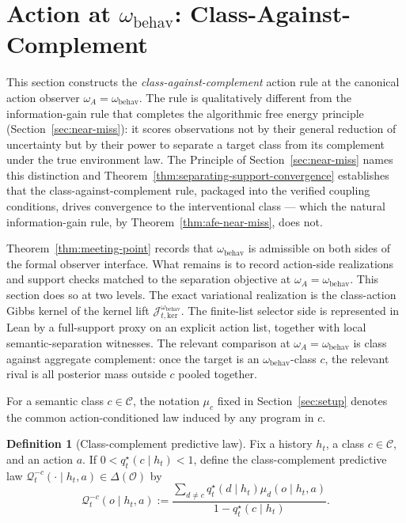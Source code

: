 \documentclass[11pt]{article}
\theoremstyle{definition}
\newtheorem{definition}[theorem]{Definition}
\theoremstyle{remark}
\theoremstyle{plain}
\theoremstyle{definition}
\newcommand{\Ccal}{\mathcal{C}}
\newcommand{\Ocal}{\mathcal{O}}
\newcommand{\Qcal}{\mathcal{Q}}
\begin{document}
\section{Action at $\omega_{\mathrm{behav}}$: Class-Against-Complement}
\label{sec:semantic-action}

This section constructs the \emph{class-against-complement} action rule at the canonical action observer $\omega_A=\omega_{\mathrm{behav}}$. The rule is qualitatively different from the information-gain rule that completes the algorithmic free energy principle (Section~\ref{sec:near-miss}): it scores observations not by their general reduction of uncertainty but by their power to separate a target class from its complement under the true environment law. The Principle of Section~\ref{sec:near-miss} names this distinction and Theorem~\ref{thm:separating-support-convergence} establishes that the class-against-complement rule, packaged into the verified coupling conditions, drives convergence to the interventional class --- which the natural information-gain rule, by Theorem~\ref{thm:afe-near-miss}, does not.

Theorem~\ref{thm:meeting-point} records that $\omega_{\mathrm{behav}}$ is admissible on both sides of the formal observer interface. What remains is to record action-side realizations and support checks matched to the separation objective at $\omega_A=\omega_{\mathrm{behav}}$. This section does so at two levels. The exact variational realization is the class-action Gibbs kernel of the kernel lift $\mathcal J_{t,\mathrm{ker}}^{\omega_{\mathrm{behav}}}$. The finite-list selector side is represented in Lean by a full-support proxy on an explicit action list, together with local semantic-separation witnesses. The relevant comparison at $\omega_A=\omega_{\mathrm{behav}}$ is class against aggregate complement: once the target is an $\omega_{\mathrm{behav}}$-class $c$, the relevant rival is all posterior mass outside $c$ pooled together.

For a semantic class $c\in\Ccal$, the notation $\mu_c$ fixed in Section~\ref{sec:setup} denotes the common action-conditioned law induced by any program in $c$.

\begin{definition}[Class-complement predictive law]
\label{def:class-complement}
Fix a history $h_t$, a class $c\in\Ccal$, and an action $a$. If $0<q_t^\star(c\mid h_t)<1$, define the class-complement predictive law $\Qcal_t^{-c}(\cdot\mid h_t,a)\in\Delta(\Ocal)$ by
\[
\Qcal_t^{-c}(o\mid h_t,a)
:=
\frac{\sum_{d\neq c} q_t^\star(d\mid h_t)\mu_d(o\mid h_t,a)}
{1-q_t^\star(c\mid h_t)}.
\]
\end{definition}
\end{document}

